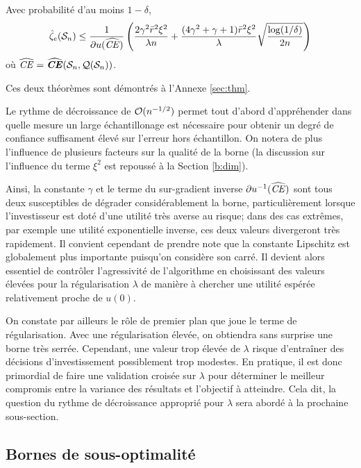\begin{thm}
  \label{thm2}
  Avec probabilité d'au moins $1-\delta$,
  \begin{equation}
    \hat\zeta_e(\mathcal S_n) \leq \frac{1}{\partial u(\operatorname{\widehat{\operatorname{\mbox{\textit{CE}}}}})}\left( \frac{2\gamma^2\bar r^2\xi^2}{\lambda n} + \frac{(4\gamma^2 + \gamma +
        1)\bar r^2\xi^2}{\lambda}\sqrt{\frac{\log(1/\delta)}{2n}}\right) 
  \end{equation}
  où $\operatorname{\widehat{\operatorname{\mbox{\textit{CE}}}}} = \operatorname{\widehat{\operatorname{\mbox{\textbf{\textit{CE}}}}}}(\mathcal S_n,\mathcal{Q}(\mathcal S_n))$. 
\end{thm}

Ces deux théorèmes sont démontrés à l'Annexe \ref{sec:thm}.

Le rythme de décroissance de $\mathcal O(n^{-1/2})$ permet tout d'abord d'appréhender dans
quelle mesure un large échantillonage est nécessaire pour obtenir un degré de confiance
suffisament élevé sur l'erreur hors échantillon. On notera de plus l'influence de
plusieurs facteurs sur la qualité de la borne (la discussion sur l'influence du terme
$\xi^2$ est repoussé à la Section \ref{b:dim}).

Ainsi, la constante $\gamma$ et le terme du sur-gradient inverse $\partial u^{-1}(\operatorname{\widehat{\operatorname{\mbox{\textit{CE}}}}})$ sont tous
deux susceptibles de dégrader considérablement la borne, particulièrement lorsque
l'investisseur est doté d'une utilité très averse au risque; dans des cas extrêmes, par
exemple une utilité exponentielle inverse, ces deux valeurs divergeront très
rapidement. Il convient cependant de prendre note que la constante Lipschitz est
globalement plus importante puisqu'on considère son carré. Il devient alors essentiel de
contrôler l'agressivité de l'algorithme en choisissant des valeurs élevées pour la
régularisation $\lambda$ de manière à chercher une utilité espérée relativement proche de
$u(0)$.

On constate par ailleurs le rôle de premier plan que joue le terme de régularisation. Avec
une régularisation élevée, on obtiendra sans surprise une borne très serrée. Cependant,
une valeur trop élevée de $\lambda$ risque d'entraîner des décisions d'investissement
possiblement trop modestes. En pratique, il est donc primordial
de faire une validation croisée sur $\lambda$ pour déterminer le meilleur compromis entre la
variance des résultats et l'objectif à atteindre. Cela dit, la question du rythme de
décroissance approprié pour $\lambda$ sera abordé à la prochaine sous-section.


\subsection{Bornes de sous-optimalité}
\label{b:sopt}


